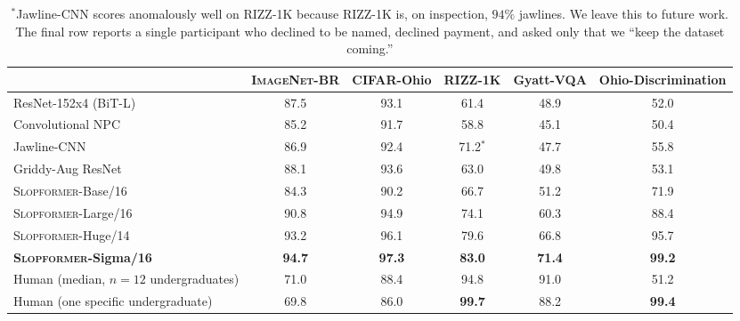 \documentclass[10pt]{article}
\newcommand{\slop}{\textsc{Slopformer}}
\newcommand{\br}{\textsc{ImageNet-BR}}
\begin{document}
\begin{table}[t]
\centering
\caption{\textbf{Transfer accuracy (top-1, \%) of \slop{} and baselines.}
All \slop{} models are pre-trained on JFT-300B. \textsc{Ohio-Discrimination} is
the auxiliary task of determining which of two images is ``more Ohio''; human
inter-annotator agreement on this task is $51.2\%$, i.e.\ chance, which we
report as evidence that the task is hard rather than meaningless.}
\label{tab:main}
\small
\begin{tabular}{lccccc}
\toprule
& \br{} & CIFAR-Ohio & RIZZ-1K & Gyatt-VQA & Ohio-Discrimination \\
\midrule
ResNet-152x4 (BiT-L) \citep{he2016deep}  & 87.5 & 93.1 & 61.4 & 48.9 & 52.0 \\
Convolutional NPC \citep{npc2022dialogue} & 85.2 & 91.7 & 58.8 & 45.1 & 50.4 \\
Jawline-CNN \citep{gigachad2021jawline}   & 86.9 & 92.4 & 71.2$^{\ast}$ & 47.7 & 55.8 \\
Griddy-Aug ResNet \citep{griddy2022hit}   & 88.1 & 93.6 & 63.0 & 49.8 & 53.1 \\
\midrule
\slop{}-Base/16   & 84.3 & 90.2 & 66.7 & 51.2 & 71.9 \\
\slop{}-Large/16  & 90.8 & 94.9 & 74.1 & 60.3 & 88.4 \\
\slop{}-Huge/14   & 93.2 & 96.1 & 79.6 & 66.8 & 95.7 \\
\textbf{\slop{}-Sigma/16} & \textbf{94.7} & \textbf{97.3} & \textbf{83.0} & \textbf{71.4} & \textbf{99.2} \\
\midrule
Human (median, $n{=}12$ undergraduates) & 71.0 & 88.4 & 94.8 & 91.0 & 51.2 \\
Human (one specific undergraduate)      & 69.8 & 86.0 & \textbf{99.7} & 88.2 & \textbf{99.4} \\
\bottomrule
\end{tabular}
\vspace{0.3em}
\caption*{\small $^{\ast}$Jawline-CNN scores anomalously well on RIZZ-1K
because RIZZ-1K is, on inspection, $94\%$ jawlines. We leave this to future
work. The final row reports a single participant who declined to be named,
declined payment, and asked only that we ``keep the dataset coming.''}
\end{table}
\end{document}

